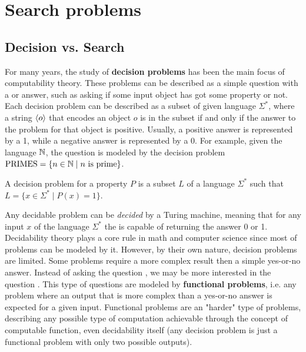 
\chapter{Search problems} \label{chap:search_problems}

\section{Decision vs. Search}

For many years, the study of \textbf{decision problems} has been the main focus of computability theory. These problems can be described as a simple question with a  or  answer, such as asking if some input object has got some property or not. Each decision problem can be described as a subset of given language $\Sigma^*$, where a string $\left\langle o\right\rangle$ that encodes an object $o$ is in the subset if and only if the answer to the problem for that object is positive. Usually, a positive  answer is represented by a 1, while a negative  answer is represented by a 0. For example, given the language $\mathbb{N}$, the question  is modeled by the decision problem $\mathrm{PRIMES} = \{n \in \mathbb{N} \mid n \text{ is prime}\}$.

\begin{definition}
    A decision problem for a property $P$ is a subset $L$ of a language $\Sigma^*$ such that $L = \{x \in \Sigma^* \mid P(x) = 1\}$.
\end{definition}

Any decidable problem can be \textit{decided} by a Turing machine, meaning that for any input $x$ of the language $\Sigma^*$ the \TM is capable of returning the answer 0 or 1. Decidability theory plays a core rule in math and computer science since most of problems can be modeled by it. However, by their own nature, decision problems are limited. Some problems require a more complex result then a simple yes-or-no answer. Instead of asking the question , we may be more interested in the question . This type of questions are modeled by \textbf{functional problems}, i.e. any problem where an output that is more complex than a yes-or-no answer is expected for a given input. Functional problems are an "harder" type of problems, describing any possible type of computation achievable through the concept of computable function, even decidability itself (any decision problem is just a functional problem with only two possible outputs).

